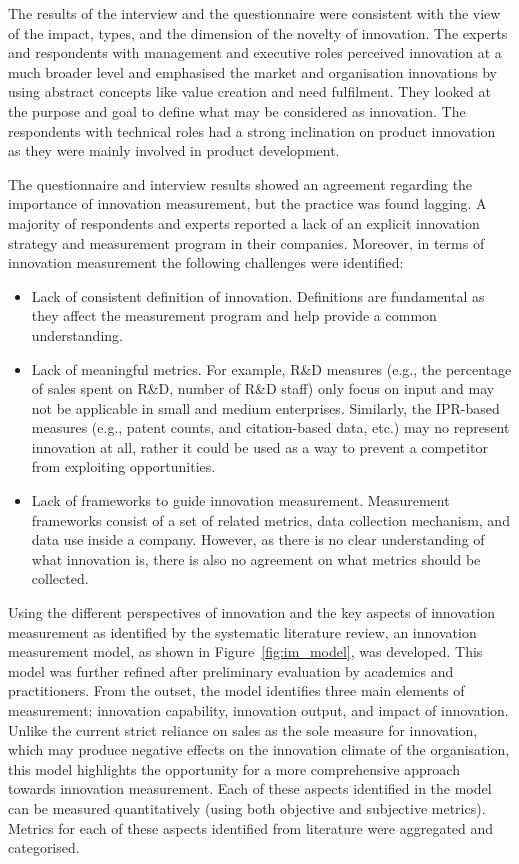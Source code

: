 \documentclass[sigconf,review]{acmart}
\begin{document}
The results of the interview and the questionnaire were consistent with the view of the impact, types, and the dimension of the novelty of innovation. The experts and respondents with management and executive roles perceived innovation at a much broader level and emphasised the market and organisation innovations by using abstract concepts like value creation and need fulfilment. They looked at the purpose and goal to define what may be considered as innovation. The respondents with technical roles had a strong inclination on product innovation as they were mainly involved in product development.

The questionnaire and interview results showed an agreement regarding the importance of innovation measurement, but the practice was found lagging. A majority of respondents and experts reported a lack of an explicit innovation strategy and measurement program in their companies. Moreover, in terms of innovation measurement the following challenges were identified:

\begin{itemize}
    \item Lack of consistent definition of innovation. Definitions are fundamental as they affect the measurement program and help provide a common understanding.
    \item Lack of meaningful metrics. For example, R\&D measures (e.g., the percentage of sales spent on R\&D, number of R\&D staff) only focus on input and may not be applicable in small and medium enterprises. Similarly, the IPR-based measures (e.g., patent counts, and citation-based data, etc.) may no represent innovation at all, rather it could be used as a way to prevent a competitor from exploiting opportunities.
    \item Lack of frameworks to guide innovation measurement. Measurement frameworks consist of a set of related metrics, data collection mechanism, and data use inside a company. However, as there is no clear understanding of what innovation is, there is also no agreement on what metrics should be collected.
\end{itemize}

Using the different perspectives of innovation and the key aspects of innovation measurement as identified by the systematic literature review, an innovation measurement model, as shown in Figure~\ref{fig:im_model}, was developed. This model was further refined after preliminary evaluation by academics and practitioners. From the outset, the model identifies three main elements of measurement: innovation capability, innovation output, and impact of innovation. Unlike the current strict reliance on sales as the sole measure for innovation, which may produce negative effects on the innovation climate of the organisation, this model highlights the opportunity for a more comprehensive approach towards innovation measurement. Each of these aspects identified in the model can be measured quantitatively (using both objective and subjective metrics). Metrics for each of these aspects identified from literature were aggregated and categorised.
\end{document}
